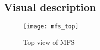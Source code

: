 \documentclass[a4paper,11pt]{report}
\begin{document}

\subsection{Visual description}
\vfill
\begin{figure}[hb] 
\centering
\texttt{[image: mfs\_top]}
\caption{Top view of MFS} \label{mfs_top}
\end{figure} 
\end{document}
